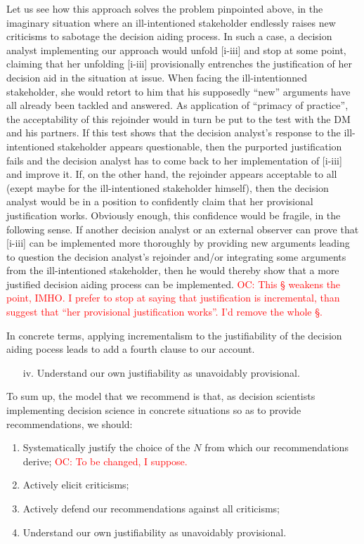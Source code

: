 \documentclass[preprint, french, english, 11pt, authoryear]{elsarticle}%
\newcommand{\commentOC}[1]{\textcolor{red}{OC: #1}}
\begin{document}
Let us see how this approach solves the problem pinpointed above, in the imaginary situation where an ill-intentioned stakeholder endlessly raises new criticisms to sabotage the decision aiding process. In such a case, a decision analyst implementing our approach would unfold [i-iii] and stop at some point, claiming that her unfolding [i-iii] provisionally entrenches the justification of her decision aid in the situation at issue. When facing the ill-intentionned stakeholder, she would retort to him that his supposedly ``new'' arguments have all already been tackled and answered. As application of ``primacy of practice'', the acceptability of this rejoinder would in turn be put to the test with the \ac{DM} and his partners. If this test shows that the decision analyst's response to the ill-intentioned stakeholder appears questionable, then the purported justification fails and the decision analyst has to come back to her implementation of [i-iii] and improve it. If, on the other hand, the rejoinder appears acceptable to all (exept maybe for the ill-intentioned stakeholder himself), then the decision analyst would be in a position to confidently claim that her provisional justification works. Obviously enough, this confidence would be fragile, in the following sense. If another decision analyst or an external observer can prove that [i-iii] can be implemented more thoroughly by providing new arguments leading to question the decision analyst's rejoinder and/or integrating some arguments from the ill-intentioned stakeholder, then he would thereby show that a more justified decision aiding process can be implemented.
\commentOC{This § weakens the point, IMHO. I prefer to stop at saying that justification is incremental, than suggest that “her provisional justification works”. I’d remove the whole §.}

In concrete terms, applying incrementalism to the justifiability of the decision aiding pocess leads to add a fourth clause to our account.
\begin{itemize}
\item[iv.]	Understand our own justifiability as unavoidably provisional.
\end{itemize}

To sum up, the model that we recommend is that, as decision scientists implementing decision science in concrete situations so as to provide recommendations, we should:
\begin{enumerate}[label=\roman*.]
	\item Systematically justify the choice of the $N$ from which our recommendations derive; \commentOC{To be changed, I suppose.}
	\item Actively elicit criticisms;
	\item Actively defend our recommendations against all criticisms;
	\item Understand our own justifiability as unavoidably provisional.
\end{enumerate}
\end{document}
